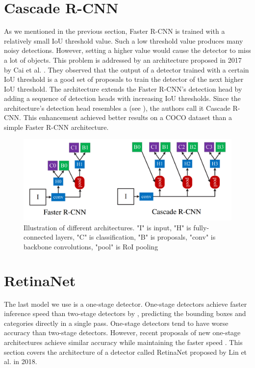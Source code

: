 \section{Cascade R-CNN}
As we mentioned in the previous section, Faster R-CNN is trained with a
relatively small IoU threshold value. Such a low threshold value produces many
noisy detections. However, setting a higher value would cause the detector
to miss a lot of objects. This problem is addressed by an architecture
proposed in 2017 by Cai et al. \cite{cascadercnn}. They observed that the
output of a detector trained with a certain IoU threshold is a good set
of proposals to train the detector of the next higher IoU threshold. The
architecture extends the Faster R-CNN's detection head by adding a sequence
of detection heads with increasing IoU thresholds. Since the architecture's
detection head resembles a  (see ),
the authors call it Cascade R-CNN. This enhancement achieved better results
on a COCO dataset \cite{coco} than a simple Faster R-CNN architecture.

\begin{figure}[h]
    \centering
    \includegraphics[width=0.7\linewidth]{Sources/Figures/cascade.png}
    \caption{Illustration of different architectures. "I" is input, "H" is
        fully-connected layers, "C" is classification, "B" is proposals, "conv" is
        backbone convolutions, "pool" is RoI pooling \cite{cascadercnn}}
    \label{fig:cascade}
\end{figure}

\section{RetinaNet}
The last model we use is a one-stage detector. One-stage detectors achieve
faster inference speed than two-stage detectors by , predicting the bounding boxes and categories directly
in a single pass. One-stage detectors tend to have worse accuracy than
two-stage detectors.  However, recent proposals of new one-stage architectures
achieve similar accuracy while maintaining the faster speed \cite{retinanet,
    yolo3}. This section covers the architecture of a detector called RetinaNet
proposed by Lin et al. in 2018.

